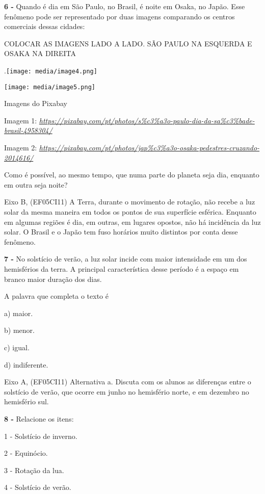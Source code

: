 \textbf{6 -} Quando é dia em São Paulo, no Brasil, é noite em Osaka, no
Japão. Esse fenômeno pode ser representado por duas imagens comparando
os centros comerciais dessas cidades:

COLOCAR AS IMAGENS LADO A LADO. SÃO PAULO NA ESQUERDA E OSAKA NA DIREITA

.\texttt{[image: media/image4.png]}

\texttt{[image: media/image5.png]}

Imagens do Pixabay

Imagem 1:
\href{https://pixabay.com/pt/photos/s\%c3\%a3o-paulo-dia-da-sa\%c3\%bade-brasil-4958304/}{\emph{https://pixabay.com/pt/photos/s\%c3\%a3o-paulo-dia-da-sa\%c3\%bade-brasil-4958304/}}

Imagem 2:
\href{https://pixabay.com/pt/photos/jap\%c3\%a3o-osaka-pedestres-cruzando-2014616/}{\emph{https://pixabay.com/pt/photos/jap\%c3\%a3o-osaka-pedestres-cruzando-2014616/}}

Como é possível, ao mesmo tempo, que numa parte do planeta seja dia,
enquanto em outra seja noite?

Eixo B, (EF05CI11) A Terra, durante o movimento de rotação, não recebe a
luz solar da mesma maneira em todos os pontos de sua superfície
esférica. Enquanto em algumas regiões é dia, em outras, em lugares
opostos, não há incidência da luz solar. O Brasil e o Japão tem fuso
horários muito distintos por conta desse fenômeno.

\textbf{7 -} No solstício de verão, a luz solar incide com maior
intensidade em um dos hemisférios da terra. A principal característica
desse período é a espaço em branco maior duração dos dias.

A palavra que completa o texto é

a) maior.

b) menor.

c) igual.

d) indiferente.

Eixo A, (EF05CI11) Alternativa a. Discuta com os alunos as diferenças
entre o solstício de verão, que ocorre em junho no hemisfério norte, e
em dezembro no hemisfério sul.

\textbf{8 -} Relacione os itens:

1 - Solstício de inverno.

2 - Equinócio.

3 - Rotação da lua.

4 - Solstício de verão.

